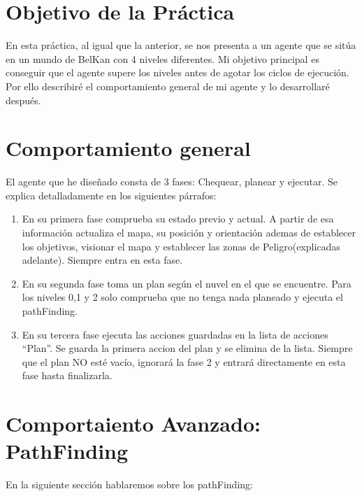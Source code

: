 \documentclass[12pt, spanish]{article}
\begin{document}
\newpage



\tableofcontents
\pagebreak


\section{Objetivo de la Práctica}
En esta práctica, al igual que la anterior, se nos presenta a un agente que se sitúa en un mundo de BelKan con 4 niveles diferentes. Mi objetivo principal es conseguir que el agente supere los niveles antes de agotar los ciclos de ejecución. Por ello describiré el comportamiento general de mi agente y lo desarrollaré después.

\section{Comportamiento general}
El agente que he diseñado consta de 3 fases: Chequear, planear y ejecutar. Se explica detalladamente en los siguientes párrafos:
\begin{enumerate}
 \item En su primera fase comprueba su estado previo y actual. A partir de esa información actualiza el mapa, su posición y orientación ademas de establecer los objetivos, visionar el mapa y establecer las zonas de Peligro(explicadas adelante). Siempre entra en esta fase.

 \item En su segunda fase toma un plan según el nuvel en el que se encuentre. Para los niveles 0,1 y 2 solo comprueba que no tenga nada planeado y ejecuta el pathFinding.


  \item En su tercera fase ejecuta las acciones guardadas en la lista de acciones ``Plan''. Se guarda la primera accion del plan y se elimina de la lista. Siempre que el plan NO esté vacío, ignorará la fase 2 y entrará directamente en esta fase hasta finalizarla.

\end{enumerate}


\section{Comportaiento Avanzado: PathFinding}
En la siguiente sección hablaremos sobre los pathFinding:
\end{document}
